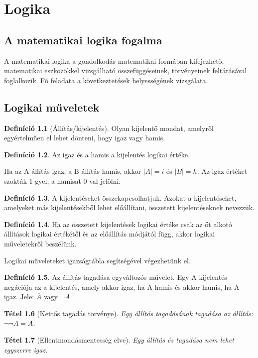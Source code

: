 \documentclass[twoside,12pt]{report}
\newtheorem{theorem}{Tétel}[section]
\theoremstyle{definition}
\newtheorem{definition}[theorem]{Definíció}
\begin{document}
\chapter{Logika}
\section{A matematikai logika fogalma}
	A matematikai logika a gondolkodás matematikai formában kifejezhető, matematikai eszközökkel	vizsgálható összefüggéseinek, törvényeinek feltárásával foglalkozik. Fõ feladata a következtetések helyességének vizsgálata.
\section{Logikai műveletek}
	\begin{definition}[Állítás/kijelentés]
		Olyan kijelentő mondat, amelyről egyértelműen el lehet dönteni, hogy igaz vagy hamis.
	\end{definition}
	\begin{definition}
		Az igaz és a hamis a kijelentés logikai értéke.
	\end{definition}
	Ha az A állítás igaz, a B állítás hamis, akkor $|A|=i$ és $|B|=h$. Az igaz értéket szokták 1-gyel, a hamisat 0-val jelölni.
	\begin{definition}
		A kijelentéseket összekapcsolhatjuk. Azokat a kijelentéseket, amelyeket más kijelentésekből lehet előállítani, összetett kijelentéseknek nevezzük.
	\end{definition}
	\begin{definition}
		Ha az összetett kijelentések logikai értéke csak az őt alkotó állítások logikai értékétől és az előállítás módjától függ, akkor logikai műveletekről beszélünk.
	\end{definition}
	Logikai műveleteket igazságtábla segítségével végezhetünk el.
	\begin{definition}
		Az állítás tagadása egyváltozós művelet. Egy A kijelentés negációja	az a kijelentés, amely akkor igaz, ha A hamis és akkor hamis, ha A igaz. Jele: $\overline{A}$  vagy $\neg A$.
	\end{definition}
	\begin{theorem}[Kettős tagadás törvénye]
		Egy állítás tagadásának tagadása az állítás: $\neg\neg A=A$.
	\end{theorem}
	\begin{theorem}[Ellentmondásmentesség elve]
		Egy állítás és tagadása nem lehet egyszerre igaz.
	\end{theorem}
\end{document}
